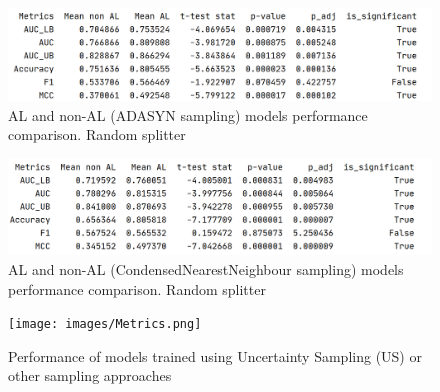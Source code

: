 \documentclass[a4paper,10pt]{article}
\begin{document}
\begin{figure}[3]
    \includegraphics[keepaspectratio=true, scale=0.33]{images/ADASYN.png}
    \caption{AL and non-AL (ADASYN sampling) models performance comparison. Random splitter}
    \label{fig:3}
\end{figure}

\begin{figure}[4]
    \centering
    \includegraphics[keepaspectratio=true, scale=0.33]{images/CondensedNearestNeighbour.png}
    \caption{AL and non-AL (CondensedNearestNeighbour sampling) models performance comparison. Random splitter}
    \label{fig:4}
\end{figure}


\begin{figure}[5]
    \centering
    \texttt{[image: images/Metrics.png]}
    \caption{Performance of models trained using Uncertainty Sampling (US) or other sampling approaches}
    \label{fig:5}
\end{figure}

\medskip



\end{document}
